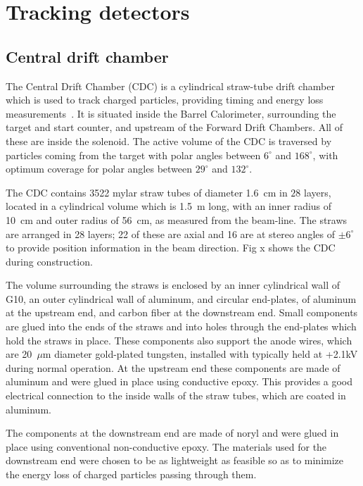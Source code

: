 \section{Tracking detectors \label{sec:tracking}}
\subsection[Central drift chamber (Naomi)]{Central drift chamber \label{sec:cdc}}

The Central Drift Chamber (CDC) is a cylindrical straw-tube drift chamber which is used to track charged particles, providing timing and energy loss measurements~\cite{GlueXCDCNIM}.
It is situated inside the Barrel Calorimeter, surrounding the target and start counter, and upstream of the Forward Drift Chambers. 
All of these are inside the solenoid. 
The active volume of the CDC is traversed
by particles coming from the target with polar angles between $6^{\circ}$ and $168^{\circ}$, with optimum 
coverage for polar angles between $29^{\circ}$ and $132^{\circ}$.  

The CDC contains 3522 mylar straw tubes of diameter 1.6~cm in $28$ layers,
located in a cylindrical volume which is 1.5~m long, with an inner radius of 10~cm and outer radius of 56~cm, as measured from the beam-line.  
The straws are arranged in 28 layers; 22 of these are axial and 16 are at stereo angles of $\pm 6^{\circ}$ to provide position information in the beam direction. Fig x shows the CDC during construction. 

The volume surrounding the straws is enclosed by an inner cylindrical wall of G10, an outer cylindrical wall of aluminum, and circular end-plates, of aluminum at the upstream end, and carbon fiber at the downstream end.  
Small components are glued into the ends of the straws and into holes through the end-plates which hold the straws in place. 
These components also support the anode wires, which are 20~$\mu$m diameter gold-plated tungsten, installed with typically held at +2.1kV during normal operation. 
At the upstream end these components are made of aluminum and were glued in place using conductive epoxy. 
This provides a good electrical connection to the inside walls of the straw tubes, which are coated in aluminum.


The components at the downstream end are made of noryl and were glued in place using conventional non-conductive epoxy.
The materials used for the downstream end were chosen to be as lightweight as feasible so as to minimize the energy loss of charged particles passing through them. 

